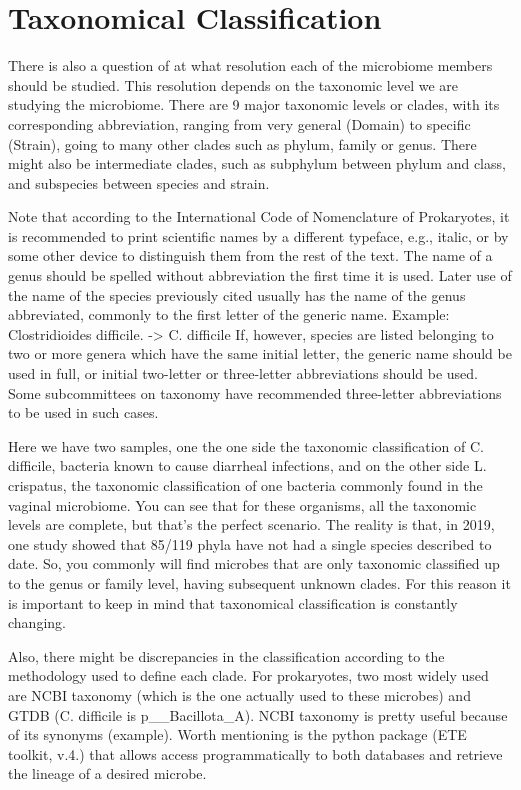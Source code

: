 \section{Taxonomical Classification}
There is also a question of at what resolution each of the microbiome members should be studied. This resolution depends 
on the taxonomic level we are studying the microbiome. There are 9 major taxonomic levels or clades, with its corresponding 
abbreviation, ranging from very general (Domain) to specific (Strain), going to many other clades such as phylum, family or genus. 
There might also be intermediate clades, such as subphylum between phylum and class, and subspecies between species and strain.


Note that according to the International Code of Nomenclature of Prokaryotes, it is recommended to print scientific names 
by a different typeface, e.g., italic, or by some other device to distinguish them from the rest of the text. The name of a 
genus should be spelled without abbreviation the first time it is used. Later use of the name of the species previously cited 
usually has the name of the genus abbreviated, commonly to the first letter of the generic name. 
Example: Clostridioides difficile. -> C. difficile If, however, species are listed belonging to two or more genera which have 
the same initial letter, the generic name should be used in full, or initial two-letter or three-letter abbreviations 
should be used. Some subcommittees on taxonomy have recommended three-letter abbreviations to be used in such cases.


Here we have two samples, one the one side the taxonomic classification of C. difficile, bacteria known to cause diarrheal 
infections, and on the other side L. crispatus, the taxonomic classification of one bacteria commonly found in the vaginal 
microbiome. You can see that for these organisms, all the taxonomic levels are complete, but that's the perfect scenario. 
The reality is that, in 2019, one study showed that 85/119 phyla have not had a single species described to date. So, 
you commonly will find microbes that are only taxonomic classified up to the genus or family level, having subsequent 
unknown clades. For this reason it is important to keep in mind that taxonomical classification is constantly changing.

Also, there might be discrepancies in the classification according to the methodology used to define each clade. 
For prokaryotes, two most widely used are NCBI taxonomy (which is the one actually used to these microbes) and 
GTDB (C. difficile is p\_\_Bacillota\_A). NCBI taxonomy is pretty useful because of its synonyms (example). Worth mentioning 
is the python package (ETE toolkit, v.4.) that allows access programmatically to both databases and retrieve the 
lineage of a desired microbe.



